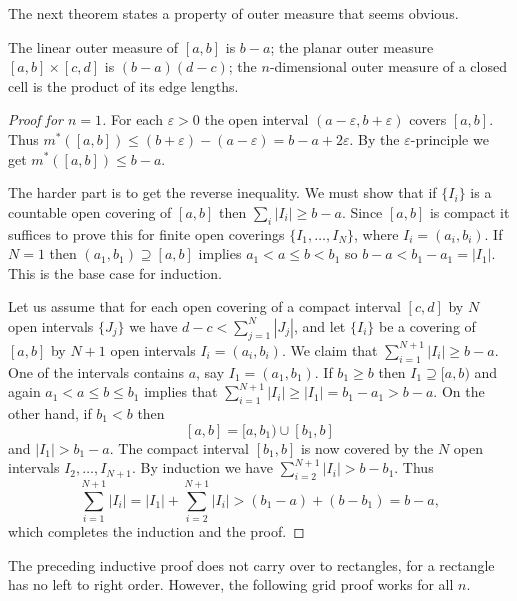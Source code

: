 \documentclass[11pt]{article}
\begin{document}
The next theorem states a property of outer measure that seems obvious.

\begin{thm}
  The linear outer measure of $[a,b]$ is $b-a$; the planar outer measure $[a,b] \times [c,d]$ is $(b-a)(d-c)$; the $n$-dimensional outer measure of a closed cell is the product of its edge lengths.
\end{thm}

\begin{proof}[Proof for $n=1$]
  For each $\varepsilon > 0$ the open interval $(a-\varepsilon, b+\varepsilon)$ covers $[a,b]$.  Thus $m^*([a,b]) \leqslant (b+\varepsilon) - (a-\varepsilon) = b-a+2\varepsilon$.  By the $\varepsilon$-principle we get $m^*([a,b]) \leqslant b-a$.

  The harder part is to get the reverse inequality.  We must show that if $\{ I_i \}$ is a countable open covering of $[a,b]$ then $\sum_i |I_i| \geqslant b-a$.  Since $[a,b]$ is compact it suffices to prove this for finite open coverings $\{ I_1, \dots, I_N \}$, where $I_i = (a_i, b_i)$.  If $N=1$ then $(a_1, b_1) \supseteq [a,b]$ implies $a_1 < a \leqslant b < b_1$ so $b-a < b_1 - a_1 = |I_1|$.  This is the base case for induction.  

  Let us assume that for each open covering of a compact interval $[c,d]$ by $N$ open intervals $\{ J_j \}$ we have $d-c < \sum_{j=1}^N |J_j|$, and let $\{ I_i \}$ be a covering of $[a,b]$ by $N+1$ open intervals $I_i = (a_i, b_i)$.  We claim that $\sum_{i=1}^{N+1}|I_i| \geqslant b-a$.  One of the intervals contains $a$, say $I_1 = (a_1, b_1)$.  If $b_1 \geqslant b$ then $I_1 \supseteq [a,b)$ and again $a_1 < a \leqslant b \leqslant b_1$ implies that $\sum_{i=1}^{N+1} |I_i| \geqslant |I_1| = b_1 - a_1 > b-a$.  On the other hand, if $b_1 < b$ then
  \[
    [a,b] = [a, b_1) \cup [b_1, b]
  \]
  and $|I_1| > b_1 - a$.  The compact interval $[b_1, b]$ is now covered by the $N$ open intervals $I_2, \dots, I_{N+1}$.  By induction we have $\sum_{i=2}^{N+1} |I_i| > b - b_1$.  Thus
  \[
    \sum_{i=1}^{N+1} |I_i| = |I_1| + \sum_{i=2}^{N+1} |I_i| > (b_1-a) + (b-b_1) = b-a,
  \]
  which completes the induction and the proof.
\end{proof}

The preceding inductive proof does not carry over to rectangles, for a rectangle has no left to right order.  However, the following grid proof works for all $n$.
\end{document}
